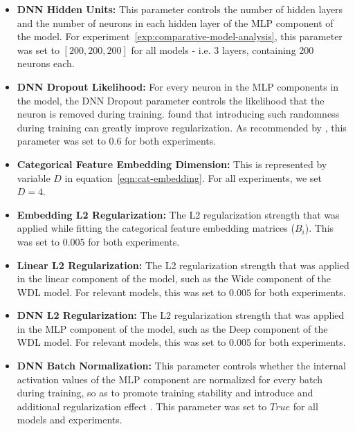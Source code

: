 \documentclass{mldsmsc}
\begin{document}
\begin{itemize}
    \item \textbf{DNN Hidden Units:} This parameter controls the number of hidden layers and the number of neurons
    in each hidden layer of the MLP component of the model. For experiment~\ref{exp:comparative-model-analysis},
    this parameter was set to $[200,200,200]$ for all models - i.e. 3 layers, containing 200 neurons each.

    \item \textbf{DNN Dropout Likelihood:} For every neuron in the MLP components in the model, the DNN Dropout
    parameter controls the likelihood that the neuron is removed during training. \cite{RefWorks:srivastava2014dropout:}
    found that introducing such randomness during training can greatly improve regularization. As recommended
    by \cite{RefWorks:guo2017deepfm:}, this parameter was set to $0.6$ for both experiments.

    \item \textbf{Categorical Feature Embedding Dimension:} This is represented by variable $D$
    in equation~\ref{eqn:cat-embedding}. For all experiments, we set $D=4$.

    \item \textbf{Embedding L2 Regularization:} The L2 regularization strength that was applied while fitting
    the categorical feature embedding matrices ($B_i$). This was set to $0.005$ for both experiments.

    \item \textbf{Linear L2 Regularization:} The L2 regularization strength that was applied in the
    linear component of the model, such as the Wide component of the WDL model. 
    For relevant models, this was set to $0.005$ for both experiments.

    \item \textbf{DNN L2 Regularization:} The L2 regularization strength that was applied in the
    MLP component of the model, such as the Deep component of the WDL model. 
    For relevant models, this was set to $0.005$ for both experiments.

    \item \textbf{DNN Batch Normalization:} This parameter controls whether the internal activation
    values of the MLP component are normalized for every batch during training, so as to
    promote training stability and introduce and additional regularization effect \citep{RefWorks:ioffe2015batch}. This
    parameter was set to $True$ for all models and experiments. 
\end{itemize}
\end{document}
